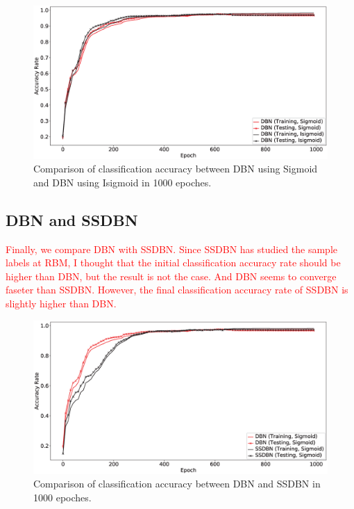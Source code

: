 \documentclass{modified}
\begin{document}
\begin{figure}[htbp]
	\centering
	\includegraphics[width=\columnwidth]{SigmoidVSIsigmoid.eps}
	\caption{Comparison of classification accuracy between DBN using Sigmoid and DBN using Isigmoid in 1000 epoches.}
	\label{fig:SigmoidVSIsigmoid}
\end{figure}

\subsection{DBN and SSDBN}
\textcolor{red}{Finally, we compare DBN with SSDBN. Since SSDBN has studied the sample labels at RBM, I thought that the initial classification accuracy rate should be higher than DBN, but the result is not the case. And DBN seems to converge faseter than SSDBN. However, the final classification accuracy rate of SSDBN is slightly higher than DBN.}

\begin{figure}[htbp]
	\centering
	\includegraphics[width=\columnwidth]{SSDBN.eps}
	\caption{Comparison of classification accuracy between DBN and SSDBN in 1000 epoches.}
	\label{fig:SSDBN}
\end{figure}
\end{document}
